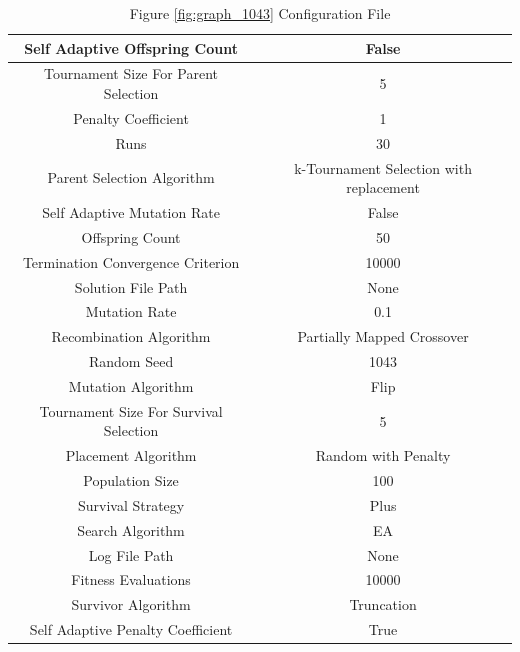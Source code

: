 \documentclass{standalone}
\begin{document}
\begin{table}[!htb]
	\centering
	\caption{Figure \ref{fig:graph_1043} Configuration File}
	\label{tab:graph_1043}
	\begin{tabular}{| c | c |}
		\hline
		Self Adaptive Offspring Count		& False		 \\
		\hline
		Tournament Size For Parent Selection		& 5		 \\
		\hline
		Penalty Coefficient		& 1		 \\
		\hline
		Runs		& 30		 \\
		\hline
		Parent Selection Algorithm		& k-Tournament Selection with replacement		 \\
		\hline
		Self Adaptive Mutation Rate		& False		 \\
		\hline
		Offspring Count		& 50		 \\
		\hline
		Termination Convergence Criterion		& 10000		 \\
		\hline
		Solution File Path		& None		 \\
		\hline
		Mutation Rate		& 0.1		 \\
		\hline
		Recombination Algorithm		& Partially Mapped Crossover		 \\
		\hline
		Random Seed		& 1043		 \\
		\hline
		Mutation Algorithm		& Flip		 \\
		\hline
		Tournament Size For Survival Selection		& 5		 \\
		\hline
		Placement Algorithm		& Random with Penalty		 \\
		\hline
		Population Size		& 100		 \\
		\hline
		Survival Strategy		& Plus		 \\
		\hline
		Search Algorithm		& EA		 \\
		\hline
		Log File Path		& None		 \\
		\hline
		Fitness Evaluations		& 10000		 \\
		\hline
		Survivor Algorithm		& Truncation		 \\
		\hline
		Self Adaptive Penalty Coefficient		& True		 \\
		\hline
	\end{tabular}
\end{table}
\end{document}
